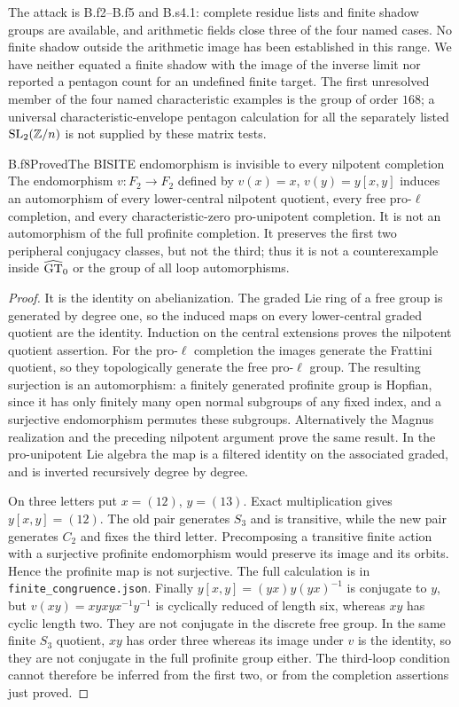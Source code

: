 The attack is B.f2--B.f5 and B.s4.1: complete residue lists and finite
shadow groups are available, and arithmetic fields close three of the
four named cases. No finite shadow outside the arithmetic image has
been established in this range. We have neither equated a finite shadow
with the image of the inverse limit nor reported a pentagon count for
an undefined finite target. The first unresolved member of the four
named characteristic examples is the group of order $168$; a universal
characteristic-envelope pentagon calculation for all the separately
listed $\operatorname{SL}_2(\mathbb Z/n)$ is not supplied by these matrix tests.

\begin{claim}{B.f8}{Proved}{The BISITE endomorphism is invisible to every nilpotent completion}
The endomorphism $v:F_2\to F_2$ defined by
$v(x)=x$, $v(y)=y[x,y]$ induces an automorphism of every lower-central
nilpotent quotient, every free pro-$\ell$ completion, and every
characteristic-zero pro-unipotent completion. It is not an automorphism
of the full profinite completion. It preserves the first two peripheral
conjugacy classes, but not the third; thus it is not a counterexample
inside $\widehat{\mathrm{GT}}_0$ or the group of all loop automorphisms.
\end{claim}

\begin{proof}
It is the identity on abelianization. The graded Lie ring of a free
group is generated by degree one, so the induced maps on every
lower-central graded quotient are the identity. Induction on the
central extensions proves the nilpotent quotient assertion. For the
pro-$\ell$ completion the images generate the Frattini quotient,
so they topologically generate the free pro-$\ell$ group. The resulting
surjection is an automorphism: a finitely generated profinite group is
Hopfian, since it has only finitely many open normal subgroups of any
fixed index, and a surjective endomorphism permutes these subgroups.
Alternatively the Magnus realization and the preceding nilpotent
argument prove the same result. In the pro-unipotent Lie algebra the
map is a filtered identity on the associated graded, and is inverted
recursively degree by degree.

On three letters put $x=(12)$, $y=(13)$. Exact multiplication gives
$y[x,y]=(12)$. The old pair generates $S_3$ and is transitive, while
the new pair generates $C_2$ and fixes the third letter. Precomposing
a transitive finite action with a surjective profinite endomorphism
would preserve its image and its orbits. Hence the profinite map is
not surjective. The full calculation is in
\texttt{finite\_congruence.json}.
Finally $y[x,y]=(yx)y(yx)^{-1}$ is conjugate to $y$, but
$v(xy)=xyxyx^{-1}y^{-1}$ is cyclically reduced of length six, whereas
$xy$ has cyclic length two. They are not conjugate in the discrete
free group. In the same finite $S_3$ quotient, $xy$ has order three
whereas its image under $v$ is the identity, so they are not conjugate
in the full profinite group either. The third-loop condition cannot therefore be inferred
from the first two, or from the completion assertions just proved.
\end{proof}
